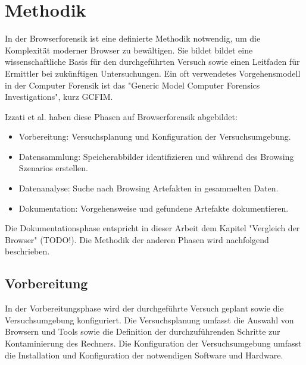 \chapter{Methodik}

In der Browserforensik ist eine definierte Methodik notwendig, um die Komplexität moderner Browser zu bewältigen. Sie bildet bildet eine wissenschaftliche Basis für den durchgeführten Versuch sowie einen Leitfaden für Ermittler bei zukünftigen Untersuchungen. \cite{Aggarwal.2010, Izzati.2022, Horsman.2019}	
Ein oft verwendetes Vorgehensmodell in der Computer Forensik ist das "Generic Model Computer Forensics Investigations", kurz GCFIM. \cite{Yusoff.2011}

Izzati et al. haben diese Phasen auf Browserforensik abgebildet: \cite{Izzati.2022}
\begin{itemize}
	\item Vorbereitung: Versuchsplanung und Konfiguration der Versuchsumgebung.
	\item Datensammlung: Speicherabbilder identifizieren und während des Browsing Szenarios erstellen. 
	\item Datenanalyse: Suche nach Browsing Artefakten in gesammelten Daten.
	\item Dokumentation: Vorgehensweise und gefundene Artefakte dokumentieren.
\end{itemize}

Die Dokumentationsphase entspricht in dieser Arbeit dem Kapitel "Vergleich der Browser" (TODO!). Die Methodik der anderen Phasen wird nachfolgend beschrieben.

\section{Vorbereitung}

In der Vorbereitungsphase wird der durchgeführte Versuch geplant sowie die Versuchsumgebung konfiguriert. \cite{Izzati.2022} Die Versuchsplanung umfasst die Auswahl von Browsern und Tools sowie die Definition der durchzuführenden Schritte zur Kontaminierung des Rechners. Die Konfiguration der Versuchsumgebung umfasst die Installation und Konfiguration der notwendigen Software und Hardware.


